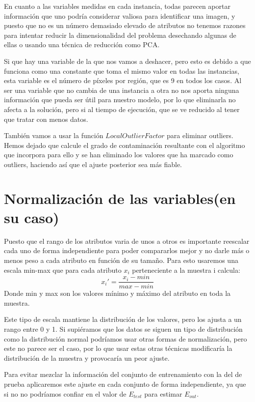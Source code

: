 \documentclass{article}
\begin{document}
	En cuanto a las variables medidas en cada instancia, todas parecen aportar información que uno podría considerar valiosa para identificar una imagen, y puesto que no es un número demasiado elevado de atributos no tenemos razones para intentar reducir la dimensionalidad del problema desechando algunas de ellas o usando una técnica de reducción como PCA.
	\par 
	Si que hay una variable de la que nos vamos a deshacer, pero esto es debido a que funciona como una constante que toma el mismo valor en todas las instancias, esta variable es el número de píxeles por región, que es 9 en todos los casos. Al ser una variable que no cambia de una instancia a otra no nos aporta ninguna información que pueda ser útil para nuestro modelo, por lo que eliminarla no afecta a la solución, pero si al tiempo de ejecución, que se ve reducido al tener que tratar con menos datos.
	\par
	También vamos a usar la función $LocalOutlierFactor$ para eliminar outliers. Hemos dejado que calcule el grado de contaminación resultante con el algoritmo que incorpora para ello y se han eliminado los valores que ha marcado como outliers, haciendo así que el ajuste posterior sea más fiable.
	
	\section{Normalización de las variables(en su caso)} %
	
	Puesto que el rango de los atributos varia de unos a otros es importante reescalar cada uno de forma independiente para poder compararlos mejor y no darle más o menos peso a cada atributo en función de su tamaño. Para esto usaremos una escala min-max que para cada atributo $x_i$ perteneciente a la muestra i calcula:
	\begin{equation}
	x_i' = \frac{x_i-min}{max-min}
	\end{equation}
	\indent Donde min y max son los valores mínimo y máximo del atributo en toda la muestra.
	\par 
	Este tipo de escala mantiene la distribución de los valores, pero los ajusta a un rango entre 0 y 1.  Si supiéramos que los datos se siguen un tipo de distribución como la distribución normal podríamos usar otras formas de normalización, pero este no parece ser el caso, por lo que usar estas otras técnicas modificaría la distribución de la muestra y provocaría un peor ajuste.
	\par 
	Para evitar mezclar la información del conjunto de entrenamiento con la del de prueba aplicaremos este ajuste en cada conjunto de forma independiente, ya que si no no podríamos confiar en el valor de $E_{test}$ para estimar $E_{out}$.
	
\end{document}
